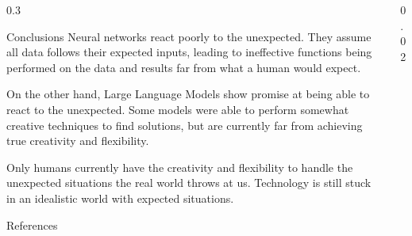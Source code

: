 \documentclass{beamer} %
\begin{document}
\begin{frame}[t]
\begin{columns}[t]
\begin{column}{0.3\textwidth}

\begin{block}{Conclusions}
	Neural networks react poorly to the unexpected. They assume all data follows their expected inputs, leading to ineffective functions being performed on the data and results far from what a human would expect.

	\bigskip
	On the other hand, Large Language Models show promise at being able to react to the unexpected. Some models were able to perform somewhat creative techniques to find solutions, but are currently far from achieving true creativity and flexibility.

	\bigskip
	Only humans currently have the creativity and flexibility to handle the unexpected situations the real world throws at us. Technology is still stuck in an idealistic world with expected situations.
\end{block}


\begin{block}{References}
	\nocite{*} %
	\small %
	\vspace{-1ex} %
\end{block}


\end{column} %

\begin{column}{0.02\textwidth}\end{column} %

\end{columns} %

\end{frame} %

\end{document}
